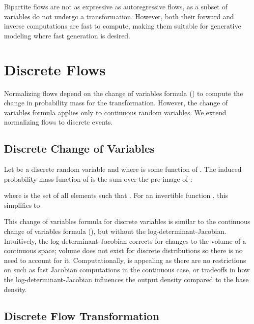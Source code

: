 \documentclass{article}
\begin{document}
Bipartite flows are not as expressive as autoregressive flows, as a subset of variables do not undergo a transformation. However, both their forward and inverse computations are fast to compute, making them suitable for generative modeling where fast generation is desired.

\section{Discrete Flows}
\label{sec:discrete}

Normalizing flows depend on the change of variables formula () to compute the change in probability mass for the transformation. However, the change of variables formula applies only to continuous random variables. We extend normalizing flows to discrete events.


\subsection{Discrete Change of Variables}

Let  be a discrete random variable and  where  is some function of . The induced probability mass function of  is the sum over the pre-image of :

where  is the set of all elements such that . For an invertible function , this simplifies to

This change of variables formula for discrete variables is similar to
the continuous change of variables formula (), but without the log-determinant-Jacobian. Intuitively, the log-determinant-Jacobian corrects for changes to the volume of a continuous space; volume does not exist for discrete distributions so there is no need to account for it. Computationally,  is appealing as there are no restrictions on  such as fast Jacobian computations in the continuous case, or tradeoffs in how the log-determinant-Jacobian influences the output density compared to the base density.

\subsection{Discrete Flow Transformation}
\end{document}
